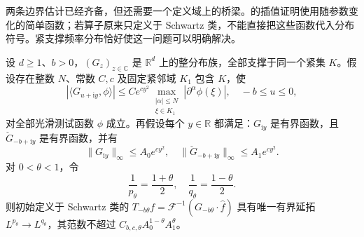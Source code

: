 两条边界估计已经齐备，但还需要一个定义域上的桥梁。的插值证明使用随参数变化的简单函数；若算子原来只定义于 Schwartz 类，不能直接把这些函数代入分布符号。紧支撑频率分布恰好使这一问题可以明确解决。

\begin{lemma}[紧支撑分布族的解析插值]\label{b2:lem:23-compact-analytic-interpolation}
设 \(d\geq1\)、\(b>0\)，\((G_z)_{z\in\mathbb C}\) 是 \(\mathbb R^d\) 上的整分布族，全部支撑于同一个紧集 \(K\)。假设存在整数 \(N\)、常数 \(C,c\) 及固定紧邻域 \(K_1\) 包含 \(K\)，使
\[
 |\langle G_{u+\mathrm iy},\phi\rangle|
 \leq C e^{cy^2}\!
 \max_{\substack{|\alpha|\leq N\\ \xi\in K_1}}
 |\partial^\alpha\phi(\xi)|,
 \quad -b\leq u\leq0,
\]
对全部光滑测试函数 \(\phi\) 成立。再假设每个 \(y\in\mathbb R\) 都满足：\(G_{\mathrm iy}\) 是有界函数，且 \(\check G_{-b+\mathrm iy}\) 是有界函数，并有
\[
 \|G_{\mathrm iy}\|_\infty\leq A_0e^{cy^2},
 \quad
 \|\check G_{-b+\mathrm iy}\|_\infty\leq A_1e^{cy^2}.
\]
对 \(0<\theta<1\)，令
\[
 \frac1{p_\theta}=\frac{1+\theta}{2},
 \quad \frac1{q_\theta}=\frac{1-\theta}{2}.
\]
则初始定义于 Schwartz 类的
\(T_{-b\theta}f=\mathcal F^{-1}(G_{-b\theta}\cdot\widehat f)\)
具有唯一有界延拓 \(L^{p_\theta}\to L^{q_\theta}\)，其范数不超过
\(C_{b,c,\theta}A_0^{1-\theta}A_1^\theta\)。
\end{lemma}
